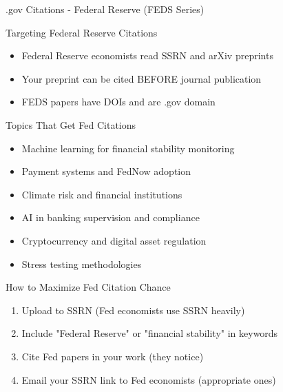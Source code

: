 \documentclass[11pt]{beamer}
\begin{document}
	\begin{frame}{.gov Citations - Federal Reserve (FEDS Series)}
		\scriptsize
		\begin{block}{Targeting Federal Reserve Citations}
			\begin{itemize}
				\item Federal Reserve economists read SSRN and arXiv preprints
				\item Your preprint can be cited BEFORE journal publication
				\item FEDS papers have DOIs and are .gov domain
			\end{itemize}
		\end{block}
		\begin{block}{Topics That Get Fed Citations}
			\begin{itemize}
				\item Machine learning for financial stability monitoring
				\item Payment systems and FedNow adoption
				\item Climate risk and financial institutions
				\item AI in banking supervision and compliance
				\item Cryptocurrency and digital asset regulation
				\item Stress testing methodologies
			\end{itemize}
		\end{block}
		\begin{block}{How to Maximize Fed Citation Chance}
			\begin{enumerate}
				\item Upload to SSRN (Fed economists use SSRN heavily)
				\item Include "Federal Reserve" or "financial stability" in keywords
				\item Cite Fed papers in your work (they notice)
				\item Email your SSRN link to Fed economists (appropriate ones)
			\end{enumerate}
		\end{block}
	\end{frame}
	
\end{document}

